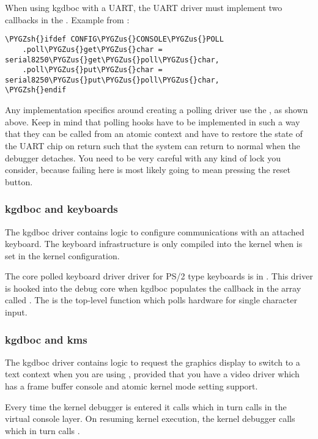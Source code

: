 \documentclass[a4paper,8pt,english]{sphinxmanual}
\def\PYGZus{\char`\_}
\def\PYGZsh{\char`\#}
\begin{document}
When using kgdboc with a UART, the UART driver must implement two
callbacks in the .
Example from :

\begin{Verbatim}[commandchars=\\\{\}]
\PYGZsh{}ifdef CONFIG\PYGZus{}CONSOLE\PYGZus{}POLL
    .poll\PYGZus{}get\PYGZus{}char = serial8250\PYGZus{}get\PYGZus{}poll\PYGZus{}char,
    .poll\PYGZus{}put\PYGZus{}char = serial8250\PYGZus{}put\PYGZus{}poll\PYGZus{}char,
\PYGZsh{}endif
\end{Verbatim}

Any implementation specifics around creating a polling driver use the
, as shown above. Keep in mind that
polling hooks have to be implemented in such a way that they can be
called from an atomic context and have to restore the state of the UART
chip on return such that the system can return to normal when the
debugger detaches. You need to be very careful with any kind of lock you
consider, because failing here is most likely going to mean pressing the
reset button.


\subsubsection{kgdboc and keyboards}
\label{dev-tools/kgdb:kgdboc-and-keyboards}
The kgdboc driver contains logic to configure communications with an
attached keyboard. The keyboard infrastructure is only compiled into the
kernel when  is set in the kernel configuration.

The core polled keyboard driver driver for PS/2 type keyboards is in
. This driver is hooked into the debug core
when kgdboc populates the callback in the array called
. The  is the top-level
function which polls hardware for single character input.


\subsubsection{kgdboc and kms}
\label{dev-tools/kgdb:kgdboc-and-kms}
The kgdboc driver contains logic to request the graphics display to
switch to a text context when you are using , provided
that you have a video driver which has a frame buffer console and atomic
kernel mode setting support.

Every time the kernel debugger is entered it calls
 which in turn calls 
in the virtual console layer. On resuming kernel execution, the kernel
debugger calls  which in turn calls
.
\end{document}
